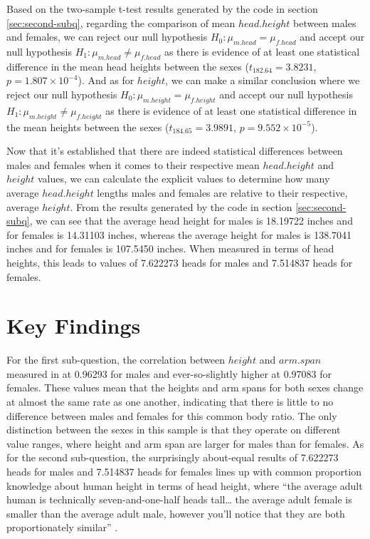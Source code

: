 \documentclass[]{article}
\begin{document}
Based on the two-sample t-test results generated by the code in section
\ref{sec:second-subq}, regarding the comparison of mean \(head.height\)
between males and females, we can reject our null hypothesis
\(H_0: \mu_{m.head}=\mu_{f.head}\) and accept our null hypothesis
\(H_1: \mu_{m.head} \neq \mu_{f.head}\) as there is evidence of at least
one statistical difference in the mean head heights between the sexes
(\(t_{182.64}=3.8231\), \(p=1.807\times10^{-4}\)). And as for
\(height\), we can make a similar conclusion where we reject our null
hypothesis \(H_0: \mu_{m.height}=\mu_{f.height}\) and accept our null
hypothesis \(H_1: \mu_{m.height} \neq \mu_{f.height}\) as there is
evidence of at least one statistical difference in the mean heights
between the sexes (\(t_{184.65}=3.9891\), \(p=9.552\times10^{-5}\)).

\vspace{0.25cm}

Now that it's established that there are indeed statistical differences
between males and females when it comes to their respective mean
\(head.height\) and \(height\) values, we can calculate the explicit
values to determine how many average \(head.height\) lengths males and
females are relative to their respective, average \(height\). From the
results generated by the code in section \ref{sec:second-subq}, we can
see that the average head height for males is 18.19722 inches and for
females is 14.31103 inches, whereas the average height for males is
138.7041 inches and for females is 107.5450 inches. When measured in
terms of head heights, this leads to values of 7.622273 heads for males
and 7.514837 heads for females.

\newpage

\section{Key Findings}
\label{sec:findings}

For the first sub-question, the correlation between \(height\) and
\(arm.span\) measured in at 0.96293 for males and ever-so-slightly
higher at 0.97083 for females. These values mean that the heights and
arm spans for both sexes change at almost the same rate as one another,
indicating that there is little to no difference between males and
females for this common body ratio. The only distinction between the
sexes in this sample is that they operate on different value ranges,
where height and arm span are larger for males than for females. As for
the second sub-question, the surprisingly about-equal results of
7.622273 heads for males and 7.514837 heads for females lines up with
common proportion knowledge about human height in terms of head height,
where ``the average adult human is technically seven-and-one-half heads
tall\ldots{} the average adult female is smaller than the average adult
male, however you'll notice that they are both proportionately similar''
\citep{Larson:2014}.
\end{document}

